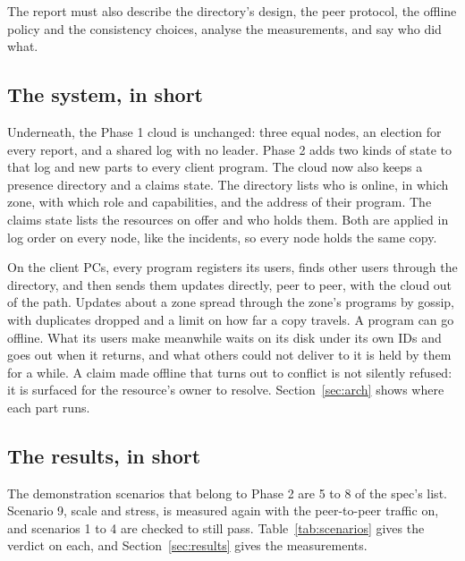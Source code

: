 The report must also describe the directory's design, the peer protocol, the offline policy and the consistency choices, analyse the measurements, and say who did what.

\subsection{The system, in short}

Underneath, the Phase 1 cloud is unchanged: three equal nodes, an election for every report, and a shared log with no leader. Phase 2 adds two kinds of state to that log and new parts to every client program. The cloud now also keeps a presence directory and a claims state. The directory lists who is online, in which zone, with which role and capabilities, and the address of their program. The claims state lists the resources on offer and who holds them. Both are applied in log order on every node, like the incidents, so every node holds the same copy.

On the client PCs, every program registers its users, finds other users through the directory, and then sends them updates directly, peer to peer, with the cloud out of the path. Updates about a zone spread through the zone's programs by gossip, with duplicates dropped and a limit on how far a copy travels. A program can go offline. What its users make meanwhile waits on its disk under its own IDs and goes out when it returns, and what others could not deliver to it is held by them for a while. A claim made offline that turns out to conflict is not silently refused: it is surfaced for the resource's owner to resolve. Section~\ref{sec:arch} shows where each part runs.

\subsection{The results, in short}

The demonstration scenarios that belong to Phase 2 are 5 to 8 of the spec's list. Scenario 9, scale and stress, is measured again with the peer-to-peer traffic on, and scenarios 1 to 4 are checked to still pass. Table~\ref{tab:scenarios} gives the verdict on each, and Section~\ref{sec:results} gives the measurements.

